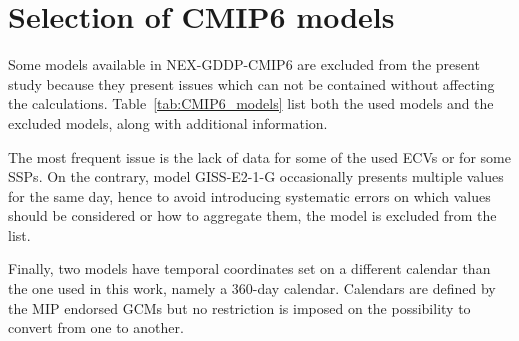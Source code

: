 \section{Selection of CMIP6 models}
\label{sec:Selection of CMIP6 models}
Some models available in NEX-GDDP-CMIP6 are excluded from the present study because they present issues which can not be contained without affecting the calculations. Table~\ref{tab:CMIP6_models} list both the used models and the excluded models, along with additional information.

The most frequent issue is the lack of data for some of the used \glspl{ECV} or for some \glspl{SSP}. On the contrary, model GISS-E2-1-G occasionally presents multiple values for the same day, hence to avoid introducing systematic errors on which values should be considered or how to aggregate them, the model is excluded from the list.

Finally, two models have temporal coordinates set on a different calendar than the one used in this work, namely a 360-day calendar. Calendars are defined by the \gls{MIP} endorsed \glspl{GCM} but no restriction is imposed on the possibility to convert from one to another.

